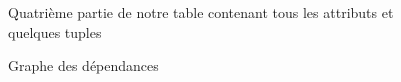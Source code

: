 \documentclass[a4paper,sffamily,12pt]{article}
\begin{document}
		\begin{figure}[!h]
			\centering						
			\caption{Quatrième partie de notre table contenant tous les attributs et quelques tuples}
			\label{table_p4}	
		\end{figure}
		
		\begin{figure}[!h]
			\centering						
			\caption{Graphe des dépendances}
			\label{graphe_dependances}	
		\end{figure}	
					
\end{document}
